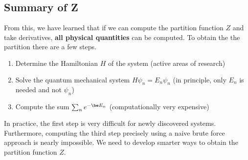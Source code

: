 \documentclass{article}
\begin{document}
\subsection{Summary of Z}
From this, we have learned that if we can compute the partition function $Z$ and take derivatives, \textbf{all physical quantities} can be computed. To obtain the the partition there are a few steps.
\begin{enumerate}
    \item Determine the Hamiltonian $H$ of the system (active areas of research)
    \item Solve the quantum mechanical system $H \psi_n = E_n \psi_n$ (in principle, only $E_n$ is needed and not $\psi_n$)
    \item Compute the sum $\sum_n e^{-\be E_n}$ (computationally very expensive)
\end{enumerate}
In practice, the first step is very difficult for newly discovered systems. Furthermore, computing the third step precisely using a naive brute force approach is nearly impossible. We need to develop smarter ways to obtain the partition function $Z$.
\end{document}
